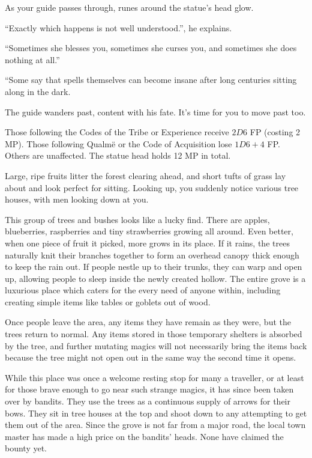 \begin{multicols}{2}
\begin{boxtext}
  As your guide passes through, runes around the statue's head glow.

  ``Exactly which happens is not well understood.'', he explains.

  ``Sometimes she blesses you, sometimes she curses you, and sometimes she does nothing at all.''

  ``Some say that spells themselves can become insane after long centuries sitting along in the dark.

  The guide wanders past, content with his fate.
  It's time for you to move past too.

\end{boxtext}

Those following the Codes of the Tribe or Experience receive $2D6$ FP (costing 2 MP).
Those following Qualm\"{e} or the Code of Acquisition lose $1D6+4$ FP.
Others are unaffected.
The statue head holds 12 MP in total.


\begin{boxtext}

  Large, ripe fruits litter the forest clearing ahead, and short tufts of grass lay about and look perfect for sitting.
  Looking up, you suddenly notice various tree houses, with men looking down at you.

\end{boxtext}

This group of trees and bushes looks like a lucky find.  There are apples, blueberries, raspberries and tiny strawberries growing all around.  Even better, when one piece of fruit it picked, more grows in its place.  If it rains, the trees naturally knit their branches together  to form an overhead canopy thick enough to keep the rain out.  If people nestle up to their trunks, they can warp and open up, allowing people to sleep inside the newly created hollow.  The entire grove is a luxurious place which caters for the every need of anyone within, including creating simple items like tables or goblets out of wood.

Once people leave the area, any items they have remain as they were, but the trees return to normal.  Any items stored in those temporary shelters is absorbed by the tree, and further mutating magics will not necessarily bring the items back because the tree might not open out in the same way the second time it opens.

While this place was once a welcome resting stop for many a traveller, or at least for those brave enough to go near such strange magics, it has since been taken over by bandits.
They use the trees as a continuous supply of arrows for their bows.
They sit in tree houses at the top and shoot down to any attempting to get them out of the area.
Since the grove is not far from a major road, the local town master has made a high price on the bandits' heads.
None have claimed the bounty yet.


\end{multicols}

